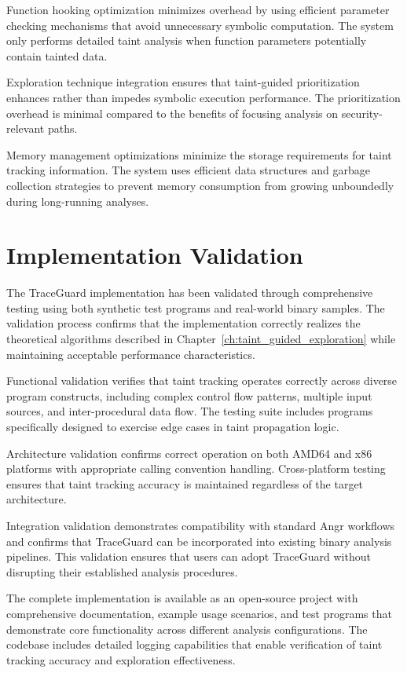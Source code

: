 Function hooking optimization minimizes overhead by using efficient parameter checking mechanisms that avoid unnecessary symbolic computation. The system only performs detailed taint analysis when function parameters potentially contain tainted data.

Exploration technique integration ensures that taint-guided prioritization enhances rather than impedes symbolic execution performance. The prioritization overhead is minimal compared to the benefits of focusing analysis on security-relevant paths.

Memory management optimizations minimize the storage requirements for taint tracking information. The system uses efficient data structures and garbage collection strategies to prevent memory consumption from growing unboundedly during long-running analyses.

\section{Implementation Validation}\label{sec:implementation_validation}

The TraceGuard implementation has been validated through comprehensive testing using both synthetic test programs and real-world binary samples. The validation process confirms that the implementation correctly realizes the theoretical algorithms described in Chapter~\ref{ch:taint_guided_exploration} while maintaining acceptable performance characteristics.

Functional validation verifies that taint tracking operates correctly across diverse program constructs, including complex control flow patterns, multiple input sources, and inter-procedural data flow. The testing suite includes programs specifically designed to exercise edge cases in taint propagation logic.

Architecture validation confirms correct operation on both AMD64 and x86 platforms with appropriate calling convention handling. Cross-platform testing ensures that taint tracking accuracy is maintained regardless of the target architecture.

Integration validation demonstrates compatibility with standard Angr workflows and confirms that TraceGuard can be incorporated into existing binary analysis pipelines. This validation ensures that users can adopt TraceGuard without disrupting their established analysis procedures.

The complete implementation is available as an open-source project with comprehensive documentation, example usage scenarios, and test programs that demonstrate core functionality across different analysis configurations. The codebase includes detailed logging capabilities that enable verification of taint tracking accuracy and exploration effectiveness.
